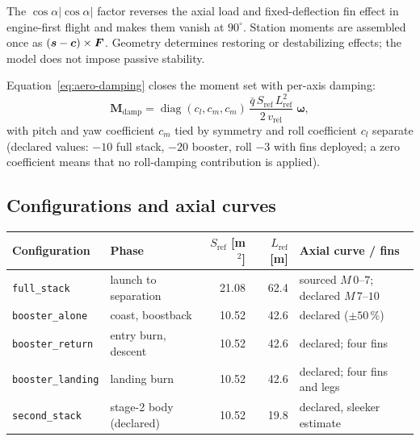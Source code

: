 The $\cos\alpha|\cos\alpha|$ factor reverses the axial load and fixed-deflection fin effect in engine-first flight and makes them vanish at $90^\circ$. Station moments are assembled once as $(\boldsymbol{s}-\boldsymbol{c})\times\boldsymbol{F}$. Geometry determines restoring or destabilizing effects; the model does not impose passive stability.

Equation~\eqref{eq:aero-damping} closes the moment set with per-axis damping:
%
\begin{equation}
\label{eq:aero-damping}
\mathbf{M}_{\mathrm{damp}} = \operatorname{diag}(c_l,c_m,c_m)\,
\frac{\bar{q}\, S_{\mathrm{ref}}\, L_{\mathrm{ref}}^2}{2\,v_{\mathrm{rel}}}
\;\boldsymbol{\omega},
\end{equation}
%
with pitch and yaw coefficient $c_m$ tied by symmetry and roll coefficient $c_l$ separate (declared values: $-10$ full stack, $-20$ booster, roll $-3$ with fins
deployed; a zero coefficient means that no roll-damping contribution is applied).

\subsection{Configurations and axial curves}

\par\medskip\noindent\begin{minipage}{\linewidth}
\centering
\begin{tabular}{llrrl}
\toprule
Configuration & Phase & $S_{\mathrm{ref}}$ [m$^2$] & $L_{\mathrm{ref}}$ [m] & Axial curve / fins \\
\midrule
\texttt{full\_stack} & launch to separation & 21.08 & 62.4 & sourced $M\,0$--$7$; declared $M\,7$--$10$ \\
\texttt{booster\_alone} & coast, boostback & 10.52 & 42.6 & declared ($\pm 50\,\%$) \\
\texttt{booster\_return} & entry burn, descent & 10.52 & 42.6 & declared; four fins \\
\texttt{booster\_landing} & landing burn & 10.52 & 42.6 & declared; four fins and legs \\
\texttt{second\_stack} & stage-2 body (declared) & 10.52 & 19.8 & declared, sleeker estimate \\
\bottomrule
\end{tabular}
\label{tab:aero-configurations}
\end{minipage}\par\medskip


